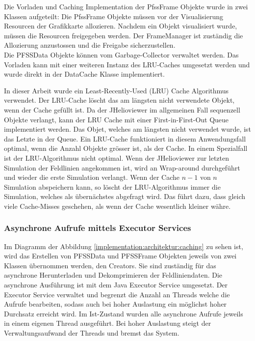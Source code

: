 Die Vorladen und Caching Implementation der PfssFrame Objekte wurde in zwei Klassen aufgeteilt: Die PfssFrame Objekte müssen vor der Visualisierung Resourcen der Grafikkarte allozieren. Nachdem ein Objekt visualisiert wurde, müssen die Resourcen freigegeben werden. Der FrameManager ist zuständig die Allozierung anzustossen und die Freigabe sicherzustellen.\\
Die PFSSData Objekte können vom Garbage-Collector verwaltet werden. Das Vorladen kann mit einer weiteren Instanz des LRU-Caches umgesetzt werden und wurde direkt in der DataCache Klasse implementiert.

In dieser Arbeit wurde ein Least-Recently-Used (LRU) Cache Algorithmus verwendet. Der LRU-Cache löscht das am längsten nicht verwendete Objekt, wenn der Cache gefüllt ist. Da der JHelioviewer im allgemeinen Fall sequenzell Objekte verlangt, kann der LRU Cache mit einer First-in-First-Out Queue implementiert werden. Das Objet, welches am längsten nicht  verwendet wurde, ist das Letzte in der Queue. Ein LRU-Cache funktioniert in diesem Anwendungsfall optimal, wenn die Anzahl Objekte grösser ist, als der Cache. In einem Spezialfall ist der LRU-Algorithmus nicht optimal. Wenn der JHelioviewer zur letzten Simulation der Feldlinien angekommen ist, wird an Wrap-around durchgeführt und wieder die erste Simulation verlangt. Wenn der Cache $n-1$ von $n$ Simulation abspeichern kann, so löscht der LRU-Algorithmus immer die Simulation, welches als übernächstes abgefragt wird. Das führt dazu, dass gleich viele Cache-Misses geschehen, als wenn der Cache wesentlich kleiner währe.

\subsubsection{Asynchrone Aufrufe mittels Executor Services}
Im Diagramm der Abbildung \ref{implementation:architektur:caching} zu sehen ist, wird das Erstellen von PFSSData und PFSSFrame Objekten jeweils von zwei Klassen übernommen werden, den Creators. Sie sind zuständig für das asynchrone Herunterladen und Dekomprimieren der Feldliniendaten. Die asynchrone Ausführung ist mit dem Java Executor Service umgesetzt. Der Executor Service verwaltet und begrenzt die Anzahl an Threads welche die Aufrufe bearbeiten, sodass auch bei hoher Auslastung ein möglichst hoher Durchsatz erreicht wird. Im Ist-Zustand wurden alle asynchrone Aufrufe jeweils in einem eigenen Thread ausgeführt. Bei hoher Auslastung steigt der Verwaltungsaufwand der Threads und bremst das System.\\